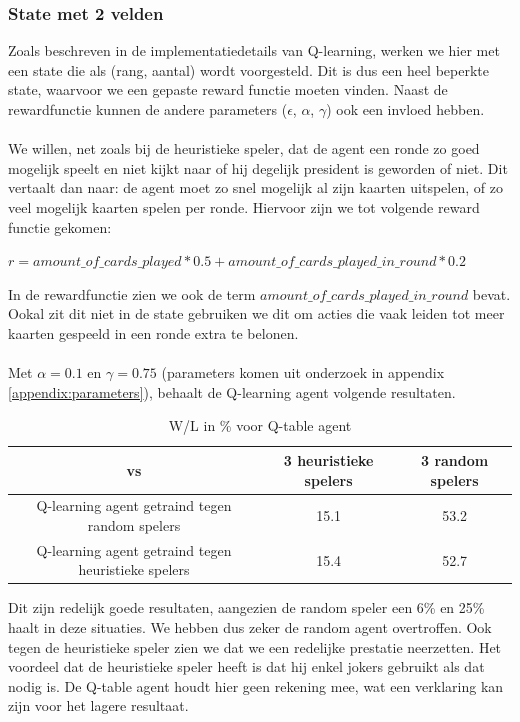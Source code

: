 \documentclass[11pt]{article}
\begin{document}
\subsubsection{State met 2 velden}
Zoals beschreven in de implementatiedetails van Q-learning, werken we hier met een state die als (rang, aantal) wordt voorgesteld. Dit is dus een heel beperkte state, waarvoor we een gepaste reward functie moeten vinden. Naast de rewardfunctie kunnen de andere parameters ($\epsilon$, $\alpha$, $\gamma$) ook een invloed hebben.\\\\
We willen, net zoals bij de heuristieke speler, dat de agent een ronde zo goed mogelijk speelt en niet kijkt naar of hij degelijk president is geworden of niet. Dit vertaalt dan naar: de agent moet zo snel mogelijk al zijn kaarten uitspelen, of zo veel mogelijk kaarten spelen per ronde. Hiervoor zijn we tot volgende reward functie gekomen:
\begin{center}
$r = amount\_of\_cards\_played * 0.5 + amount\_of\_cards\_played\_in\_round * 0.2$
\end{center}
In de rewardfunctie zien we ook de term $amount\_of\_cards\_played\_in\_round$ bevat. Ookal zit dit niet in de state gebruiken we dit om acties die vaak leiden tot meer kaarten gespeeld in een ronde extra te belonen.\\\\
Met $\alpha = 0.1$ en $\gamma = 0.75$ (parameters komen uit onderzoek in appendix \ref{appendix:parameters}), behaalt de Q-learning agent volgende resultaten. 
\begin{table}[H]
        \centering
        \begin{tabular}{|c|c|c|}
                \hline
                  vs           & 3 heuristieke spelers & 3 random spelers \\
                \hline
                 Q-learning agent getraind tegen random spelers & 15.1  & 53.2\\
                 Q-learning agent getraind tegen heuristieke spelers & 15.4 & 52.7\\
                \hline
        \end{tabular}
        \caption{W/L in \% voor Q-table agent}
\end{table}
\noindent Dit zijn redelijk goede resultaten, aangezien de random speler een 6\% en 25\% haalt in deze situaties. We hebben dus zeker de random agent overtroffen. Ook tegen de heuristieke speler zien we dat we een redelijke prestatie neerzetten. Het voordeel dat de heuristieke speler heeft is dat hij enkel jokers gebruikt als dat nodig is. De Q-table agent houdt hier geen rekening mee, wat een verklaring kan zijn voor het lagere resultaat.
\end{document}
